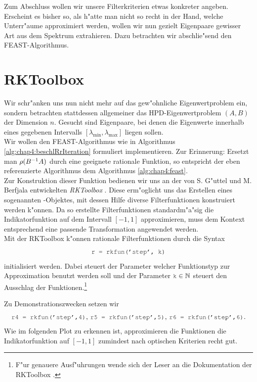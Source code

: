 Zum Abschluss wollen wir unsere Filterkriterien etwas konkreter angeben. Erscheint es bisher so, als h"atte man nicht so recht in der Hand, welche Unterr"aume approximiert werden, wollen wir nun gezielt Eigenpaare gewisser Art aus dem Spektrum extrahieren. Dazu betrachten wir abschlie"send den FEAST-Algorithmus.

\section{RKToolbox}

Wir schr"anken uns nun nicht mehr auf das gew"ohnliche Eigenwertproblem ein, sondern betrachten stattdessen allgemeiner das HPD-Eigenwertproblem $(A,B)$ der Dimension $n$. Gesucht sind Eigenpaare, bei denen die Eigenwerte innerhalb eines gegebenen Intervalls $[\lambda_{\min}, \lambda_{\max}]$ liegen sollen.\\

Wir wollen den FEAST-Algorithmus wie in Algorithmus \ref{alg:chap4:beschlRrIteration} formuliert implementieren. Zur Erinnerung: Ersetzt man $\rho(B^{-1}A)$ durch eine geeignete rationale Funktion, so entspricht der eben referenzierte Algorithmus dem Algorithmus \ref{alg:chap4:feast}.\\

Zur Konstruktion dieser Funktion bedienen wir uns an der von S. G"uttel und M. Berfjala entwickelten \emph{RKToolbox} \cite{rkt}. Diese erm"oglicht uns das Erstellen eines sogenannten -Objektes, mit dessen Hilfe diverse Filterfunktionen konstruiert werden k"onnen. Da so erstellte Filterfunktionen standardm"a"sig die Indikatorfunktion auf dem Intervall $[-1,1]$ approximieren, muss dem Kontext entsprechend eine passende Transformation angewendet werden.\\

Mit der RKToolbox k"onnen rationale Filterfunktionen  durch die Syntax
\[
\mcode{r = rkfun('step', k)}
\]
initialisiert werden. Dabei steuert der Parameter  welcher Funktionstyp zur Approximation benutzt werden soll und der Parameter $\mcode{k} \in \N$ steuert den Ausschlag der Funktionen.\footnote{F"ur genauere Ausf"uhrungen wende sich der Leser an die Dokumentation der RKToolbox \cite{rkt}.}

\newpage

Zu Demonstrationszwecken setzen wir
\[
\mcode{r4 = rkfun('step',4)}\text{,  }\mcode{r5 = rkfun('step',5)}\text{,  }
\mcode{r6 = rkfun('step',6)}.
\]
Wie im folgenden Plot zu erkennen ist, approximieren die Funktionen die Indikatorfunktion auf $[-1,1]$ zumindest nach optischen Kriterien recht gut.

